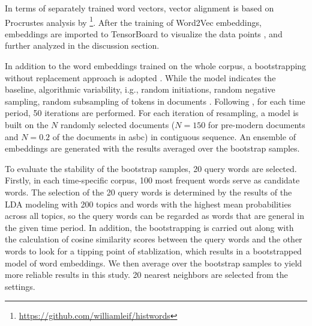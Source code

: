 In terms of separately trained word vectors, vector alignment is based on Procrustes analysis by \textcite{hamilton2016law}\footnote{\url{https://github.com/williamleif/histwords}}. After the training of Word2Vec embeddings, embeddings are imported to TensorBoard to visualize the data points \parencite{smilkov2016projector}, and further analyzed in the discussion section.

In addition to the word embeddings trained on the whole corpus, a bootstrapping without replacement approach is adopted \parencite{antoniak2018evaluating}. While the  model indicates the baseline, algorithmic variability, i.g., random initiations, random negative sampling, random subsampling of tokens in documents \parencite{antoniak2018evaluating}. Following \textcite{antoniak2018evaluating}, for each time period, 50 iterations are performed. For each iteration of resampling, a model is built on the $N$ randomly selected documents ($N=150$ for pre-modern documents and $N=0.2$ of the documents in \gls{asbc}) in contiguous sequence. An ensemble of embeddings are generated with the results averaged over the bootstrap samples.

To evaluate the stability of the bootstrap samples, 20 query words are selected. Firstly, in each time-specific corpus, 100 most frequent words serve as candidate words. The selection of the 20 query words is determined by the results of the LDA modeling with 200 topics and words with the highest mean probabilities across all topics, so the query words can be regarded as words that are general in the given time period. In addition, the bootstrapping is carried out along with the calculation of cosine similarity scores between the query words and the other words to look for a tipping point of stablization, which results in a bootstrapped model of word embeddings. We then average over the bootstrap samples to yield more reliable results in this study. 20 nearest neighbors are selected from the  settings. 


